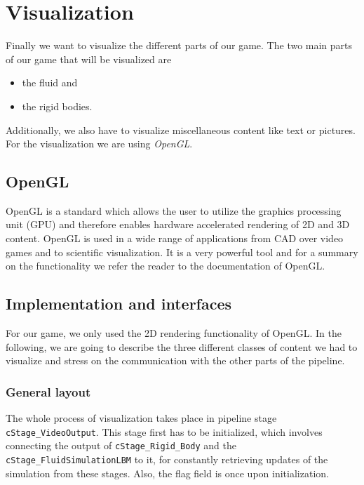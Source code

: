 \section{Visualization}
Finally we want to visualize the different parts of our game. The two main parts of our game that will be visualized are 
\begin{itemize}
\item the fluid and
\item the rigid bodies.
\end{itemize}
Additionally, we also have to visualize miscellaneous content like text or pictures. For the visualization we are using \emph{OpenGL}\cite{OpenGL}.

\subsection{OpenGL}
OpenGL is a standard which allows the user to utilize the graphics processing unit (GPU) and therefore enables hardware accelerated rendering of 2D and 3D content. OpenGL is used in a wide range of applications from CAD over video games and to scientific visualization. It is a very powerful tool and for a summary on the functionality we refer the reader to the documentation of OpenGL. 

\subsection{Implementation and interfaces}
For our game, we only used the 2D rendering functionality of OpenGL. In the following, we are going to describe the three different classes of content we had to visualize and stress on the communication with the other parts of the pipeline. 

\subsubsection{General layout}
The whole process of visualization takes place in pipeline stage \texttt{cStage_VideoOutput}. This stage first has to be initialized, which involves connecting the output of \texttt{cStage_Rigid_Body} and the \texttt{cStage_FluidSimulationLBM} to it, for constantly retrieving updates of the simulation from these stages. Also, the flag field is once upon initialization.

